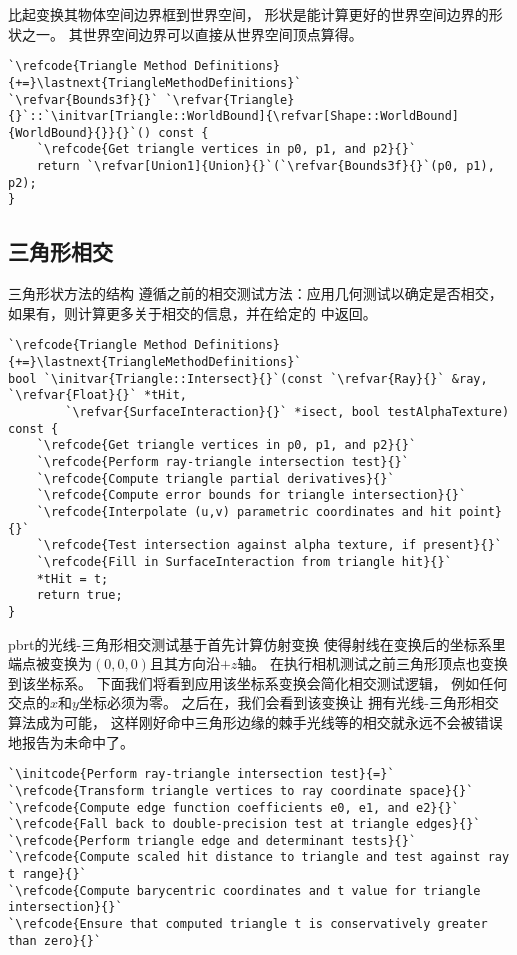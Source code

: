 比起变换其物体空间边界框到世界空间，
形状是能计算更好的世界空间边界的形状之一。
其世界空间边界可以直接从世界空间顶点算得。
\begin{lstlisting}
`\refcode{Triangle Method Definitions}{+=}\lastnext{TriangleMethodDefinitions}`
`\refvar{Bounds3f}{}` `\refvar{Triangle}{}`::`\initvar[Triangle::WorldBound]{\refvar[Shape::WorldBound]{WorldBound}{}}{}`() const {
    `\refcode{Get triangle vertices in p0, p1, and p2}{}`
    return `\refvar[Union1]{Union}{}`(`\refvar{Bounds3f}{}`(p0, p1), p2); 
}
\end{lstlisting}

\subsection{三角形相交}\label{sub:三角形相交}
三角形状方法的结构
遵循之前的相交测试方法：应用几何测试以确定是否相交，
如果有，则计算更多关于相交的信息，并在给定的
中返回。
\begin{lstlisting}
`\refcode{Triangle Method Definitions}{+=}\lastnext{TriangleMethodDefinitions}`
bool `\initvar{Triangle::Intersect}{}`(const `\refvar{Ray}{}` &ray, `\refvar{Float}{}` *tHit,
        `\refvar{SurfaceInteraction}{}` *isect, bool testAlphaTexture) const {
    `\refcode{Get triangle vertices in p0, p1, and p2}{}`
    `\refcode{Perform ray-triangle intersection test}{}`
    `\refcode{Compute triangle partial derivatives}{}`
    `\refcode{Compute error bounds for triangle intersection}{}`
    `\refcode{Interpolate (u,v) parametric coordinates and hit point}{}`
    `\refcode{Test intersection against alpha texture, if present}{}`
    `\refcode{Fill in SurfaceInteraction from triangle hit}{}`
    *tHit = t;
    return true;
}
\end{lstlisting}

pbrt的光线-三角形相交测试基于首先计算仿射变换
使得射线在变换后的坐标系里端点被变换为$(0,0,0)$且其方向沿$+z$轴。
在执行相机测试之前三角形顶点也变换到该坐标系。
下面我们将看到应用该坐标系变换会简化相交测试逻辑，
例如任何交点的$x$和$y$坐标必须为零。
之后在，我们会看到该变换让
拥有光线-三角形相交算法成为可能，
这样刚好命中三角形边缘的棘手光线等的相交就永远不会被错误地报告为未命中了。
\begin{lstlisting}
`\initcode{Perform ray-triangle intersection test}{=}`
`\refcode{Transform triangle vertices to ray coordinate space}{}`
`\refcode{Compute edge function coefficients e0, e1, and e2}{}`
`\refcode{Fall back to double-precision test at triangle edges}{}`
`\refcode{Perform triangle edge and determinant tests}{}`
`\refcode{Compute scaled hit distance to triangle and test against ray t range}{}`
`\refcode{Compute barycentric coordinates and t value for triangle intersection}{}`
`\refcode{Ensure that computed triangle t is conservatively greater than zero}{}`
\end{lstlisting}

